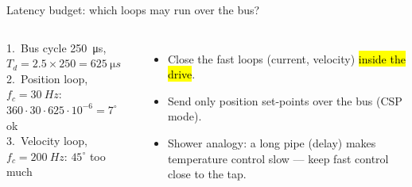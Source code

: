 \documentclass[aspectratio=169,10pt]{beamer}
\newcommand{\lbx}[4]{\draw[thick,fill=#4] (#1,0) rectangle (#2,.6); \node[align=center] at ({(#1+#2)/2},.3) {#3};}
\begin{document}
\begin{frame}{Latency budget: which loops may run over the bus?}
\centering
{}

\vspace{3mm}
\begin{columns}[T]
\begin{keybox}
\small
1.\ Bus cycle \SI{250}{\micro s}, $T_d=2.5\times250=\SI{625}{\micro s}$\\[1mm]
2.\ Position loop, $f_c=\SI{30}{Hz}$: $360\cdot30\cdot625\cdot10^{-6}=7^\circ$ \textcolor{mkGreen}{ok}\\[1mm]
3.\ Velocity loop, $f_c=\SI{200}{Hz}$: $45^\circ$ \textcolor{mkRed}{too much}
\end{keybox}
\begin{itemize}\small
\item Close the fast loops (current, velocity) \hl{inside the drive}.
\item Send only position set-points over the bus (CSP mode).
\item Shower analogy: a long pipe (delay) makes temperature control slow --- keep fast control close to the tap.
\end{itemize}
\end{columns}
\end{frame}
\end{document}
